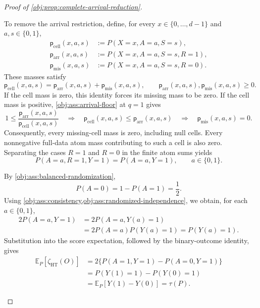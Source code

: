 \documentclass[11pt]{article}
\begin{document}
\begin{proof}[Proof of \cref{obj:prop:complete-arrival-reduction}]
\begin{enumerate}
To remove the arrival restriction, define, for every
\(x\in\{0,\ldots,d-1\}\) and \(a,s\in\{0,1\}\),
\[
\begin{aligned}
\mathsf p_{\mathrm{cell}}(x,a,s)
&:=P(X=x,A=a,S=s),\\
\mathsf p_{\mathrm{arr}}(x,a,s)
&:=P(X=x,A=a,S=s,R=1),\\
\mathsf p_{\mathrm{mis}}(x,a,s)
&:=P(X=x,A=a,S=s,R=0).
\end{aligned}
\]
These masses satisfy
\[
\mathsf p_{\mathrm{cell}}(x,a,s)
=
\mathsf p_{\mathrm{arr}}(x,a,s)
+\mathsf p_{\mathrm{mis}}(x,a,s),
\qquad
\mathsf p_{\mathrm{arr}}(x,a,s),
\mathsf p_{\mathrm{mis}}(x,a,s)\ge0.
\]
If the cell mass is zero, this identity forces its missing mass to be zero. If the cell mass is positive, \cref{obj:ass:arrival-floor} at \(q=1\) gives
\[
1\le
\frac{\mathsf p_{\mathrm{arr}}(x,a,s)}
     {\mathsf p_{\mathrm{cell}}(x,a,s)}
\quad\Longrightarrow\quad
\mathsf p_{\mathrm{cell}}(x,a,s)
\le\mathsf p_{\mathrm{arr}}(x,a,s)
\quad\Longrightarrow\quad
\mathsf p_{\mathrm{mis}}(x,a,s)=0.
\]
Consequently, every missing-cell mass is zero, including null cells. Every nonnegative full-data atom mass contributing to such a cell is also zero. Separating the cases \(R=1\) and \(R=0\) in the finite atom sums yields
\[
P(A=a,R=1,Y=1)=P(A=a,Y=1),
\qquad a\in\{0,1\}.
\]

By \cref{obj:ass:balanced-randomization},
\[
P(A=0)=1-P(A=1)=\frac12.
\]
Using \cref{obj:ass:consistency,obj:ass:randomized-independence}, we obtain, for each \(a\in\{0,1\}\),
\[
\begin{aligned}
2P(A=a,Y=1)
&=2P(A=a,Y(a)=1)\\
&=2P(A=a)P(Y(a)=1)
=P(Y(a)=1).
\end{aligned}
\]
Substitution into the score expectation, followed by the binary-outcome identity, gives
\[
\begin{aligned}
\mathbb E_P[\zeta_{\mathrm{HT}}(O)]
&=2\{P(A=1,Y=1)-P(A=0,Y=1)\}\\
&=P(Y(1)=1)-P(Y(0)=1)\\
&=\mathbb E_P[Y(1)-Y(0)]
=\tau(P).
\end{aligned}
\]


\end{enumerate}
\end{proof}
\end{document}
